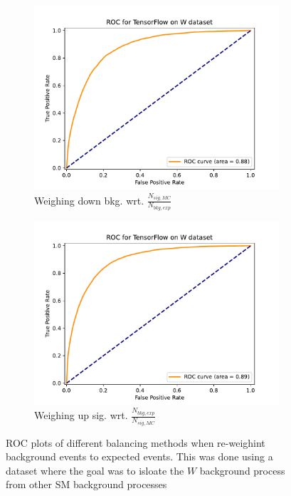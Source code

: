 \documentclass[12pt, a4paper]{book}
\begin{document}
\begin{figure}[!ht]
\begin{subfigure}[b]{0.49\textwidth}
            \centering
            \includegraphics[width=1\textwidth]{bkg_exp/ROC.pdf}
            \caption{Weighing down bkg. wrt. $\frac{N_{sig,MC}}{N_{bkg,exp}}$ }
         \end{subfigure}
         \hfill
         \begin{subfigure}[b]{0.49\textwidth}
            \centering
            \includegraphics[width=1\textwidth]{sig_exp/ROC.pdf}
            \caption{Weighing up sig. wrt. $\frac{N_{bkg,exp}}{N_{sig,MC}}$}
         \end{subfigure}
      \caption[ROC plots for re-weighting background to expected events on NNs]{ROC plots of different balancing methods when re-weighint background events to expected events. 
      This was done using a dataset where the goal was to isloate the $W$ background process from other SM background processes}\label{fig:WROC_rw}
\end{figure}
\end{document}
